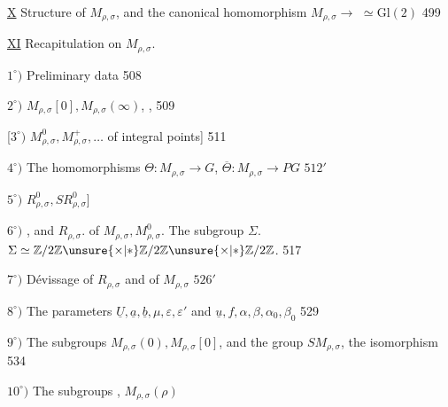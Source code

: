 \uline{X} Structure of \(M_{\rho,\sigma}\), and the canonical homomorphism
\(M_{\rho,\sigma}\longrightarrow\) \(\simeq\mathrm{Gl}(2)\) \hfill 499

\uline{XI} Recapitulation on \(M_{\rho,\sigma}\).
\hfill {}


\(1^{\circ})\) Preliminary data \hfill 508

\(2^{\circ})\) 
\(M_{\rho,\sigma}[0],M_{\rho,\sigma}(\infty)\),
,
\hfill {} 509

[\(3^{\circ})\) \(M_{\rho,\sigma}^{0},M_{\rho,\sigma}^{+},\ldots\)
 of integral points] \hfill 511

\(4^{\circ})\) The homomorphisms \(\Theta:M_{\rho,\sigma}\longrightarrow G\),
\(\overline\Theta:M_{\rho,\sigma}\longrightarrow PG\) \hfill \(512'\)

\(5^{\circ})\) \(R_{\rho,\sigma}^{0},SR_{\rho,\sigma}^{0}\)] \hfill {}

\uline{\(6^{\circ})\)} ,  and \(R_{\rho,\sigma}\).
 of \(M_{\rho,\sigma},M_{\rho,\sigma}^{0}\).
The subgroup \(\Sigma\).
\(\Sigma\simeq\mathbb Z/2\mathbb Z\unsure{\times|*}\mathbb Z/2\mathbb Z\unsure{\times|*}\mathbb Z/2\mathbb Z\).
\hfill {} 517

\uline{\(7^{\circ})\)} Dévissage of \(R_{\rho,\sigma}\) and of \(M_{\rho,\sigma}\) \hfill \(526'\)

\(8^{\circ})\) The parameters
\(\underline U,\underline a,\underline b,\mu,\varepsilon,\varepsilon'\) and
\(\underline u,f,\alpha,\beta,\alpha_0,\beta_0\)
 \hfill 529

\(9^{\circ})\) The subgroups \(M_{\rho,\sigma}(0),M_{\rho,\sigma}[0]\), and the group
\(SM_{\rho,\sigma}\), the isomorphism  \hfill 534

\(10^{\circ})\) The  subgroups
, \(M_{\rho,\sigma}(\rho)\) \hfill {}

